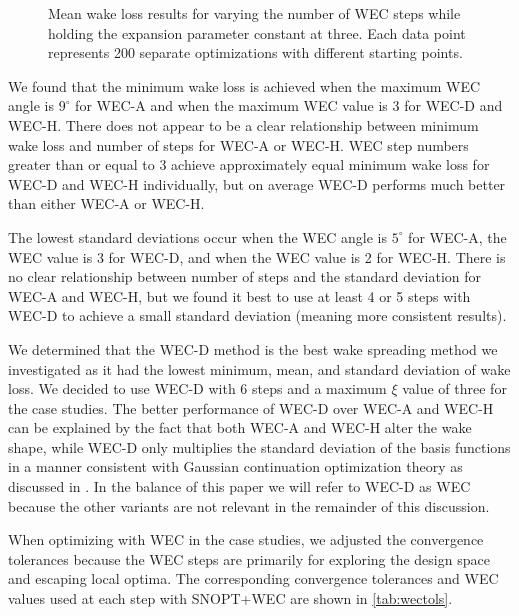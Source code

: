 \documentclass[journal abbreviation, manuscript]{copernicus}
\begin{document}
\begin{figure}[ht]
\begin{minipage}[t]{0.47\textwidth}
			\caption{Mean wake loss results for varying the number of WEC steps while holding the expansion parameter constant at three. Each data point represents 200 separate optimizations with different starting points.}
			\label{fig:aepmean-ws}
		\end{minipage}
	\end{figure}
	
	We found that the minimum wake loss is achieved when the maximum WEC angle is $9^\circ$ for WEC-A and when the maximum WEC value is 3 for WEC-D and WEC-H. There does not appear to be a clear relationship between minimum wake loss and number of steps for WEC-A or WEC-H. WEC step numbers greater than or equal to 3 achieve approximately equal minimum wake loss for WEC-D and WEC-H individually, but on average WEC-D performs much better than either WEC-A or WEC-H.
	
	The lowest standard deviations occur when the WEC angle is $5^\circ$ for WEC-A, the WEC value is 3 for WEC-D, and when the WEC value is 2 for WEC-H. There is no clear relationship between number of steps and the standard deviation for WEC-A and WEC-H, but we found it best to use at least 4 or 5 steps with WEC-D to achieve a small standard deviation (meaning more consistent results).
	
	We determined that the WEC-D method is the best wake spreading method we investigated as it had the lowest minimum, mean, and standard deviation of wake loss. We decided to use WEC-D with 6 steps and a maximum $\xi$ value of three for the case studies. The better performance of WEC-D over WEC-A and WEC-H can be explained by the fact that both WEC-A and WEC-H alter the wake shape, while WEC-D only multiplies the standard deviation of the basis functions in a manner consistent with Gaussian continuation optimization theory as discussed in \cite{mobahi2015}. In the balance of this paper we will refer to WEC-D as WEC because the other variants are not relevant in the remainder of this discussion. 
	
	When optimizing with WEC in the case studies, we adjusted the convergence tolerances because the WEC steps are primarily for exploring the design space and escaping local optima. The corresponding convergence tolerances and WEC values used at each step with SNOPT+WEC are shown in \ref{tab:wectols}. 
	
\end{document}
